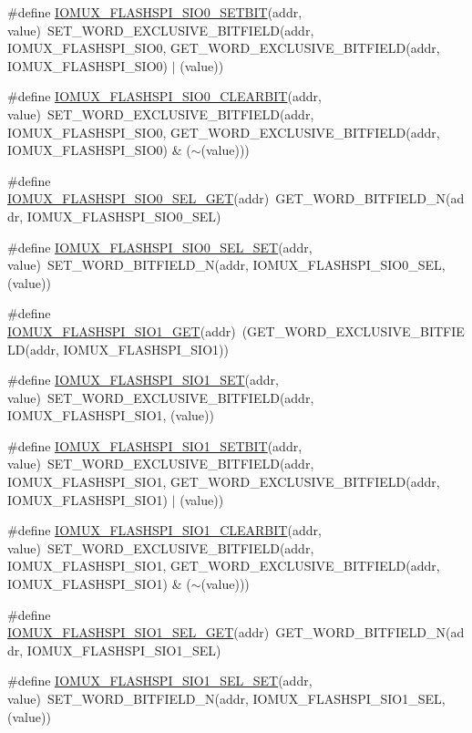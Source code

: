 \begin{DoxyCompactItemize}
\item 
\#define \hyperlink{a00559_a99a3c24b2a63c883d82e99525662864b}{IOMUX\_\-FLASHSPI\_\-SIO0\_\-SETBIT}(addr, value)~SET\_\-WORD\_\-EXCLUSIVE\_\-BITFIELD(addr, IOMUX\_\-FLASHSPI\_\-SIO0, GET\_\-WORD\_\-EXCLUSIVE\_\-BITFIELD(addr, IOMUX\_\-FLASHSPI\_\-SIO0) $|$ (value))
\item 
\#define \hyperlink{a00559_a935377be55b211fc33d2bca4d84378f7}{IOMUX\_\-FLASHSPI\_\-SIO0\_\-CLEARBIT}(addr, value)~SET\_\-WORD\_\-EXCLUSIVE\_\-BITFIELD(addr, IOMUX\_\-FLASHSPI\_\-SIO0, GET\_\-WORD\_\-EXCLUSIVE\_\-BITFIELD(addr, IOMUX\_\-FLASHSPI\_\-SIO0) \& ($\sim$(value)))
\item 
\#define \hyperlink{a00559_a05f971406aa1928bdceec62e60b115ff}{IOMUX\_\-FLASHSPI\_\-SIO0\_\-SEL\_\-GET}(addr)~GET\_\-WORD\_\-BITFIELD\_\-N(addr, IOMUX\_\-FLASHSPI\_\-SIO0\_\-SEL)
\item 
\#define \hyperlink{a00559_a49f4fa3d7033b2128d7cf688282d9ad2}{IOMUX\_\-FLASHSPI\_\-SIO0\_\-SEL\_\-SET}(addr, value)~SET\_\-WORD\_\-BITFIELD\_\-N(addr, IOMUX\_\-FLASHSPI\_\-SIO0\_\-SEL, (value))
\item 
\#define \hyperlink{a00559_a7ade93a59aea018346036a7065d2f175}{IOMUX\_\-FLASHSPI\_\-SIO1\_\-GET}(addr)~(GET\_\-WORD\_\-EXCLUSIVE\_\-BITFIELD(addr, IOMUX\_\-FLASHSPI\_\-SIO1))
\item 
\#define \hyperlink{a00559_aba8ad8834efa7370ec8240bd3bf8040a}{IOMUX\_\-FLASHSPI\_\-SIO1\_\-SET}(addr, value)~SET\_\-WORD\_\-EXCLUSIVE\_\-BITFIELD(addr, IOMUX\_\-FLASHSPI\_\-SIO1, (value))
\item 
\#define \hyperlink{a00559_a89f31aa528f243eaa9468a92a44d16a5}{IOMUX\_\-FLASHSPI\_\-SIO1\_\-SETBIT}(addr, value)~SET\_\-WORD\_\-EXCLUSIVE\_\-BITFIELD(addr, IOMUX\_\-FLASHSPI\_\-SIO1, GET\_\-WORD\_\-EXCLUSIVE\_\-BITFIELD(addr, IOMUX\_\-FLASHSPI\_\-SIO1) $|$ (value))
\item 
\#define \hyperlink{a00559_af4cde3ee7209b2cefa4c7fa8eaf56202}{IOMUX\_\-FLASHSPI\_\-SIO1\_\-CLEARBIT}(addr, value)~SET\_\-WORD\_\-EXCLUSIVE\_\-BITFIELD(addr, IOMUX\_\-FLASHSPI\_\-SIO1, GET\_\-WORD\_\-EXCLUSIVE\_\-BITFIELD(addr, IOMUX\_\-FLASHSPI\_\-SIO1) \& ($\sim$(value)))
\item 
\#define \hyperlink{a00559_a23850b9cc8482964533c03531859b026}{IOMUX\_\-FLASHSPI\_\-SIO1\_\-SEL\_\-GET}(addr)~GET\_\-WORD\_\-BITFIELD\_\-N(addr, IOMUX\_\-FLASHSPI\_\-SIO1\_\-SEL)
\item 
\#define \hyperlink{a00559_af3d697f871321713338c62953aaf3bdb}{IOMUX\_\-FLASHSPI\_\-SIO1\_\-SEL\_\-SET}(addr, value)~SET\_\-WORD\_\-BITFIELD\_\-N(addr, IOMUX\_\-FLASHSPI\_\-SIO1\_\-SEL, (value))

\end{DoxyCompactItemize}
